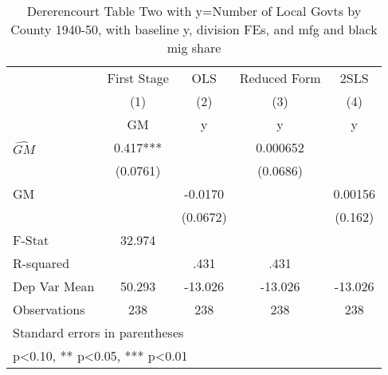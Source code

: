 \begin{table}[htbp]\centering
\def\sym#1{\ifmmode^{#1}\else\(^{#1}\)\fi}
\caption{Dererencourt Table Two with y=Number of Local Govts by County 1940-50, with baseline y, division FEs, and mfg and black mig share}
\begin{tabular}{l*{4}{c}}
\toprule
                    & First Stage   &         OLS   &Reduced Form   &        2SLS   \\
                    &\multicolumn{1}{c}{(1)}&\multicolumn{1}{c}{(2)}&\multicolumn{1}{c}{(3)}&\multicolumn{1}{c}{(4)}\\
                    &\multicolumn{1}{c}{GM}&\multicolumn{1}{c}{y}&\multicolumn{1}{c}{y}&\multicolumn{1}{c}{y}\\
\midrule
$\hat{GM}$          &       0.417***&               &    0.000652   &               \\
                    &    (0.0761)   &               &    (0.0686)   &               \\
\addlinespace
GM                  &               &     -0.0170   &               &     0.00156   \\
                    &               &    (0.0672)   &               &     (0.162)   \\
\midrule
F-Stat              &      32.974   &               &               &               \\
R-squared           &               &        .431   &        .431   &               \\
Dep Var Mean        &      50.293   &     -13.026   &     -13.026   &     -13.026   \\
Observations        &         238   &         238   &         238   &         238   \\
\bottomrule
\multicolumn{5}{l}{\footnotesize Standard errors in parentheses}\\
\multicolumn{5}{l}{\footnotesize * p<0.10, ** p<0.05, *** p<0.01}\\
\end{tabular}
\end{table}
